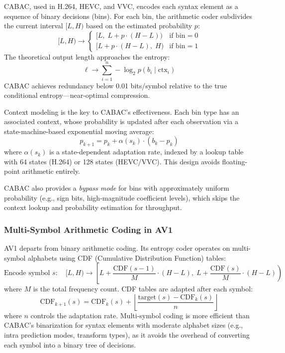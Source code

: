 CABAC, used in H.264, HEVC, and VVC, encodes each syntax element as a
sequence of binary decisions (bins). For each bin, the arithmetic coder
subdivides the current interval $[L, H)$ based on the estimated
probability $p$:
\begin{equation}
  [L, H) \to \begin{cases}
    [L,\; L + p \cdot (H - L)) & \text{if bin} = 0 \\
    [L + p \cdot (H - L),\; H) & \text{if bin} = 1
  \end{cases}
  \label{eq:arithmetic-coding}
\end{equation}
The theoretical output length approaches the entropy:
\begin{equation}
  \ell \to \sum_{i=1}^{n} -\log_2 p(b_i \mid \text{ctx}_i)
  \label{eq:cabac-length}
\end{equation}
CABAC achieves redundancy below 0.01 bits/symbol relative to the true
conditional entropy---near-optimal compression.

Context modeling is the key to CABAC's effectiveness. Each bin type has an
associated context, whose probability is updated after each observation via
a state-machine-based exponential moving average:
\begin{equation}
  p_{k+1} = p_k + \alpha(s_k) \cdot (b_k - p_k)
  \label{eq:cabac-update}
\end{equation}
where $\alpha(s_k)$ is a state-dependent adaptation rate, indexed by a
lookup table with 64 states (H.264) or 128 states (HEVC/VVC). This design
avoids floating-point arithmetic entirely.

CABAC also provides a \emph{bypass mode} for bins with approximately
uniform probability (e.g., sign bits, high-magnitude coefficient levels),
which skips the context lookup and probability estimation for throughput.

\subsubsection{Multi-Symbol Arithmetic Coding in AV1}
\label{sec:av1-entropy}

AV1 departs from binary arithmetic coding. Its entropy coder operates on
multi-symbol alphabets using CDF (Cumulative Distribution Function) tables:
\begin{equation}
  \text{Encode symbol } s: \quad
  [L, H) \to \left[L + \frac{\text{CDF}(s-1)}{M} \cdot (H-L),\;
    L + \frac{\text{CDF}(s)}{M} \cdot (H-L)\right)
  \label{eq:av1-entropy}
\end{equation}
where $M$ is the total frequency count. CDF tables are adapted after
each symbol:
\begin{equation}
  \text{CDF}_{k+1}(s) = \text{CDF}_k(s) + \left\lfloor
    \frac{\text{target}(s) - \text{CDF}_k(s)}{n}
  \right\rfloor
  \label{eq:cdf-update}
\end{equation}
where $n$ controls the adaptation rate. Multi-symbol coding is more
efficient than CABAC's binarization for syntax elements with moderate
alphabet sizes (e.g., intra prediction modes, transform types), as it
avoids the overhead of converting each symbol into a binary tree of
decisions.

